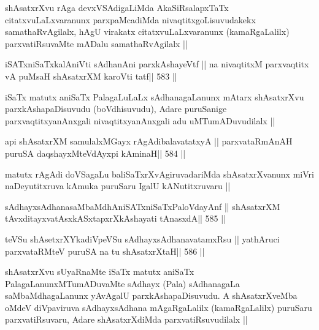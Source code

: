 \begin{artha}
shAsatxrXvu rAga devxVSAdigaLiMda AkaSiRsalapxTaTx citatxvuLaLxvaranunx 
parxpaMcadiMda nivaqtitxgoLisuvudakekx samathaRvAgilalx, hAgU
virakatx citatxvuLaLxvaranunx (kamaRgaLalilx) parxvatiRsuvaMte mADalu
samathaRvAgilalx ||
\end{artha}

\begin{shl}
iSATxniSaTxkalAniVti sAdhanAni parxkAshayeVtf ||
na nivaqtitxM parxvaqtitx vA puMsaH shAsatxrXM karoVti tatf\hfill || 583 ||
\end{shl}

\begin{artha}
iSaTx matutx aniSaTx PalagaLuLaLx sAdhanagaLanunx mAtarx shAsatxrXvu
parxkAshapaDisuvudu (boVdhisuvudu), Adare puruSanige
parxvaqtitxyanAnxgali nivaqtitxyanAnxgali adu uMTumADuvudilalx ||
\end{artha}



\begin{shl}
api shAsatxrXM samulalxMGayx rAgAdibalavatatxyA ||
parxvataRmAnAH puruSA daqshayxMteV\s dAyxpi kAminaH\hfill || 584 ||
\end{shl}

\begin{artha}
matutx rAgAdi doVSagaLu baliSaTxrXvAgiruvadariMda shAsatxrXvanunx
miVri naDeyutitxruva kAmuka puruSaru IgalU kANutitxruvaru ||
\end{artha}

\begin{shl}
sAdhayxsAdhanasaMbaMdhAniSATxniSaTxPaloVdayAnf ||
shAsatxrXM tAvxditayxvatAsxkASxtapxrXkAshayati tAnasxdA\hfill || 585 ||
\end{shl}

\begin{shl}
teVSu shAsetxrXYkadiVpeVSu sAdhayxsAdhanavatamxRsu ||
yathAruci parxvataRMteV puruSA na tu shAsatxrXtaH\hfill || 586 ||
\end{shl}

\begin{artha}
shAsatxrXvu sUyaRnaMte iSaTx matutx aniSaTx PalagaLanunxMTumADuvaMte
sAdhayx (Pala) sAdhanagaLa saMbaMdhagaLanunx yAvAgalU
parxkAshapaDisuvudu. A shAsatxrXveMba oMdeV diVpaviruva sAdhayxsAdhana
mAgaRgaLalilx (kamaRgaLalilx) puruSaru parxvatiRsuvaru, Adare
shAsatxrXdiMda parxvatiRsuvudilalx ||
\end{artha}

